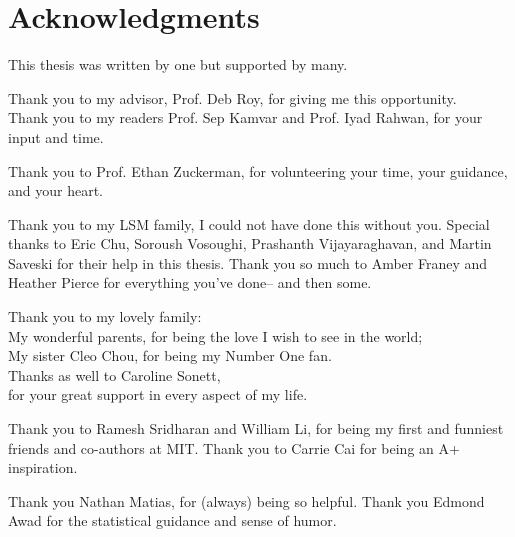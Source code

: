  
\section*{Acknowledgments}
 
 
This thesis was written by one but supported by many.

Thank you to my advisor, Prof. Deb Roy, for giving me this opportunity.\\
Thank you to my readers Prof. Sep Kamvar and Prof. Iyad Rahwan, for your input and time.

Thank you to Prof. Ethan Zuckerman, for volunteering your time, your guidance, and your heart. 


Thank you to my LSM family, I could not have done this without you. Special thanks to Eric Chu, Soroush Vosoughi, Prashanth Vijayaraghavan, and Martin Saveski for their help in this thesis. Thank you so much to Amber Franey and Heather Pierce for everything you've done-- and then some.


Thank you to my lovely family: \\
My wonderful parents, for being the love I wish to see in the world;  \\
My sister Cleo Chou, for being my Number One fan.  \\
Thanks as well to Caroline Sonett, \\ 
for your great support in every aspect of my life.
  
Thank you to Ramesh Sridharan and William Li, for being my first and funniest friends and co-authors at MIT. Thank you to Carrie Cai for being an A+ inspiration.

Thank you Nathan Matias, for (always) being so helpful. Thank you Edmond Awad for the statistical guidance and sense of humor. 

